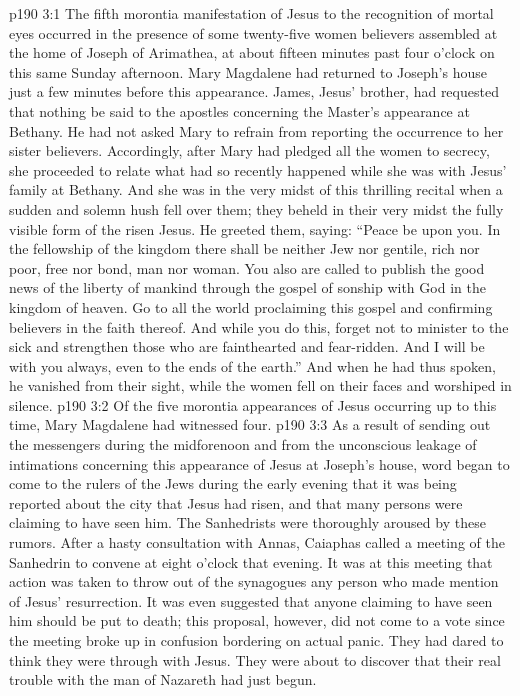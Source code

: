 \vs p190 3:1 The fifth morontia manifestation of Jesus to the recognition of mortal eyes occurred in the presence of some twenty\hyp{}five women believers assembled at the home of Joseph of Arimathea, at about fifteen minutes past four o’clock on this same Sunday afternoon. Mary Magdalene had returned to Joseph’s house just a few minutes before this appearance. James, Jesus’ brother, had requested that nothing be said to the apostles concerning the Master’s appearance at Bethany. He had not asked Mary to refrain from reporting the occurrence to her sister believers. Accordingly, after Mary had pledged all the women to secrecy, she proceeded to relate what had so recently happened while she was with Jesus’ family at Bethany. And she was in the very midst of this thrilling recital when a sudden and solemn hush fell over them; they beheld in their very midst the fully visible form of the risen Jesus. He greeted them, saying: \textcolor{ubdarkred}{“Peace be upon you. In the fellowship of the kingdom there shall be neither Jew nor gentile, rich nor poor, free nor bond, man nor woman. You also are called to publish the good news of the liberty of mankind through the gospel of sonship with God in the kingdom of heaven. Go to all the world proclaiming this gospel and confirming believers in the faith thereof. And while you do this, forget not to minister to the sick and strengthen those who are fainthearted and fear\hyp{}ridden. And I will be with you always, even to the ends of the earth.”} And when he had thus spoken, he vanished from their sight, while the women fell on their faces and worshiped in silence.
\vs p190 3:2 \pc Of the five morontia appearances of Jesus occurring up to this time, Mary Magdalene had witnessed four.
\vs p190 3:3 \pc As a result of sending out the messengers during the midforenoon and from the unconscious leakage of intimations concerning this appearance of Jesus at Joseph’s house, word began to come to the rulers of the Jews during the early evening that it was being reported about the city that Jesus had risen, and that many persons were claiming to have seen him. The Sanhedrists were thoroughly aroused by these rumors. After a hasty consultation with Annas, Caiaphas called a meeting of the Sanhedrin to convene at eight o’clock that evening. It was at this meeting that action was taken to throw out of the synagogues any person who made mention of Jesus’ resurrection. It was even suggested that anyone claiming to have seen him should be put to death; this proposal, however, did not come to a vote since the meeting broke up in confusion bordering on actual panic. They had dared to think they were through with Jesus. They were about to discover that their real trouble with the man of Nazareth had just begun.
